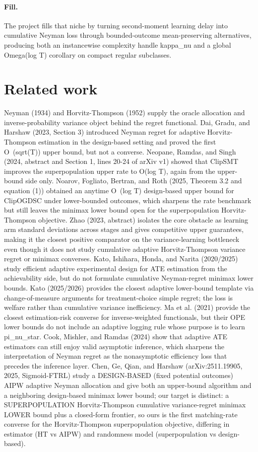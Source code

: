 \documentclass{article}
\begin{document}
\paragraph{Fill.} The project fills that niche by turning second-moment learning delay into cumulative Neyman loss through bounded-outcome mean-preserving alternatives, producing both an instancewise complexity handle kappa_nu and a global Omega(log T) corollary on compact regular subclasses.

\section{Related work}

Neyman (1934) and Horvitz-Thompson (1952) supply the oracle allocation and inverse-probability variance object behind the regret functional. Dai, Gradu, and Harshaw (2023, Section 3) introduced Neyman regret for adaptive Horvitz-Thompson estimation in the design-based setting and proved the first O~(sqrt(T)) upper bound, but not a converse. Neopane, Ramdas, and Singh (2024, abstract and Section 1, lines 20-24 of arXiv v1) showed that ClipSMT improves the superpopulation upper rate to O(log T), again from the upper-bound side only. Noarov, Fogliato, Bertran, and Roth (2025, Theorem 3.2 and equation (1)) obtained an anytime O~(log T) design-based upper bound for ClipOGDSC under lower-bounded outcomes, which sharpens the rate benchmark but still leaves the minimax lower bound open for the superpopulation Horvitz-Thompson objective. Zhao (2023, abstract) isolates the core obstacle as learning arm standard deviations across stages and gives competitive upper guarantees, making it the closest positive comparator on the variance-learning bottleneck even though it does not study cumulative adaptive Horvitz-Thompson variance regret or minimax converses. Kato, Ishihara, Honda, and Narita (2020/2025) study efficient adaptive experimental design for ATE estimation from the achievability side, but do not formulate cumulative Neyman-regret minimax lower bounds. Kato (2025/2026) provides the closest adaptive lower-bound template via change-of-measure arguments for treatment-choice simple regret; the loss is welfare rather than cumulative variance inefficiency. Ma et al. (2021) provide the closest estimation-risk converse for inverse-weighted functionals, but their OPE lower bounds do not include an adaptive logging rule whose purpose is to learn pi_nu_star. Cook, Mishler, and Ramdas (2024) show that adaptive ATE estimators can still enjoy valid asymptotic inference, which sharpens the interpretation of Neyman regret as the nonasymptotic efficiency loss that precedes the inference layer. Chen, Ge, Qian, and Harshaw (arXiv:2511.19905, 2025, Sigmoid-FTRL) study a DESIGN-BASED (fixed potential outcomes) AIPW adaptive Neyman allocation and give both an upper-bound algorithm and a neighboring design-based minimax lower bound; our target is distinct: a SUPERPOPULATION Horvitz-Thompson cumulative variance-regret minimax LOWER bound plus a closed-form frontier, so ours is the first matching-rate converse for the Horvitz-Thompson superpopulation objective, differing in estimator (HT vs AIPW) and randomness model (superpopulation vs design-based).
\end{document}
